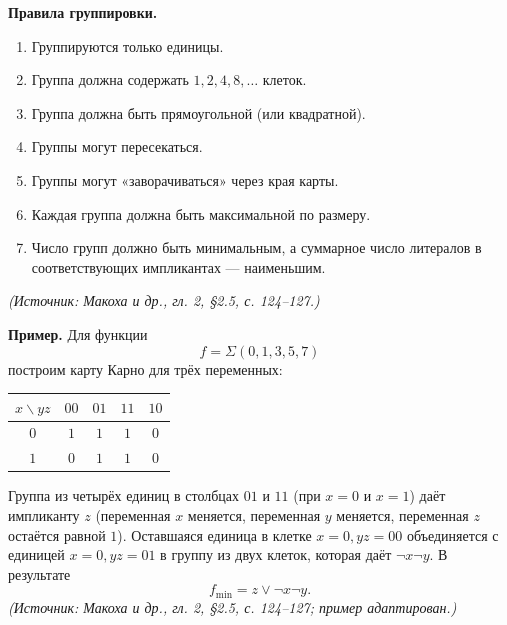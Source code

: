 \documentclass[a4paper,12pt]{article}
\begin{document}
\textbf{Правила группировки.}
\begin{enumerate}[label=\arabic*)]
\item Группируются только единицы.
\item Группа должна содержать \(1,2,4,8,\ldots\) клеток.
\item Группа должна быть прямоугольной (или квадратной).
\item Группы могут пересекаться.
\item Группы могут «заворачиваться» через края карты.
\item Каждая группа должна быть максимальной по размеру.
\item Число групп должно быть минимальным, а суммарное число литералов в соответствующих импликантах — наименьшим.
\end{enumerate}
\textit{(Источник: Макоха и др., гл. 2, §2.5, с. 124--127.)}

\textbf{Пример.} Для функции
\[
f=\Sigma(0,1,3,5,7)
\]
построим карту Карно для трёх переменных:
\begin{center}
\begin{tabular}{c|cccc}
\toprule
\(x\backslash yz\) & \(00\) & \(01\) & \(11\) & \(10\) \\
\midrule
\(0\) & \(1\) & \(1\) & \(1\) & \(0\) \\
\(1\) & \(0\) & \(1\) & \(1\) & \(0\) \\
\bottomrule
\end{tabular}
\end{center}
Группа из четырёх единиц в столбцах \(01\) и \(11\) (при \(x=0\) и \(x=1\)) даёт импликанту \(z\) (переменная \(x\) меняется, переменная \(y\) меняется, переменная \(z\) остаётся равной \(1\)). Оставшаяся единица в клетке \(x=0, yz=00\) объединяется с единицей \(x=0, yz=01\) в группу из двух клеток, которая даёт \(\neg x\neg y\). В результате
\[
f_{\min}=z\lor\neg x\neg y.
\]
\textit{(Источник: Макоха и др., гл. 2, §2.5, с. 124--127; пример адаптирован.)}
\end{document}

